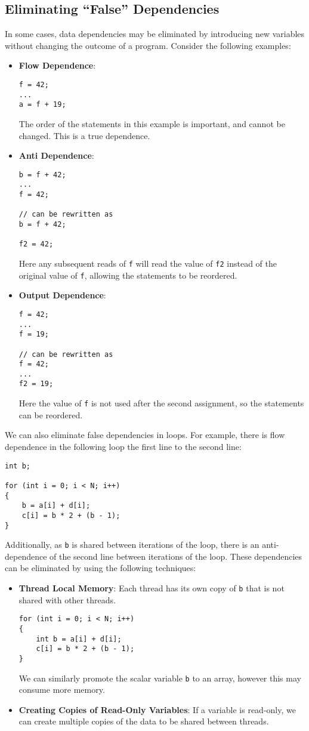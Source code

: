 \documentclass{article}
\begin{document}
\subsection{Eliminating ``False'' Dependencies}
In some cases, data dependencies may be eliminated by introducing new
variables without changing the outcome of a program. Consider the
following examples:
\begin{itemize}
    \item \textbf{Flow Dependence}:
          \begin{verbatim}
f = 42;
...
a = f + 19;
    \end{verbatim}
          The order of the statements in this example is important, and
          cannot be changed. This is a true dependence.
    \item \textbf{Anti Dependence}:
          \begin{verbatim}
b = f + 42;
...
f = 42;

// can be rewritten as
b = f + 42;

f2 = 42;
    \end{verbatim}
          Here any subsequent reads of \texttt{f} will read
          the value of \texttt{f2} instead of the original
          value of \texttt{f}, allowing the statements to be
          reordered.
    \item \textbf{Output Dependence}:
          \begin{verbatim}
f = 42;
...
f = 19;

// can be rewritten as
f = 42;
...
f2 = 19;
    \end{verbatim}
          Here the value of \texttt{f} is not used after the
          second assignment, so the statements can be reordered.
\end{itemize}
We can also eliminate false dependencies in loops. For example, there is
flow dependence in the following loop the first line to the second line:
\begin{verbatim}
int b;

for (int i = 0; i < N; i++)
{
    b = a[i] + d[i];
    c[i] = b * 2 + (b - 1);
}
\end{verbatim}
Additionally, as \texttt{b} is shared between iterations of
the loop, there is an anti-dependence of the second line between
iterations of the loop. These dependencies can be eliminated by using
the following techniques:
\begin{itemize}
    \item \textbf{Thread Local Memory}: Each thread has its own copy of
          \texttt{b} that is not shared with other threads.
          \begin{verbatim}
for (int i = 0; i < N; i++)
{
    int b = a[i] + d[i];
    c[i] = b * 2 + (b - 1);
}
    \end{verbatim}
          We can similarly promote the scalar variable
          \texttt{b} to an array, however this may consume
          more memory.
    \item \textbf{Creating Copies of Read-Only Variables}: If a variable
          is read-only, we can create multiple copies of the data to be
          shared between threads.
\end{itemize}
\end{document}
